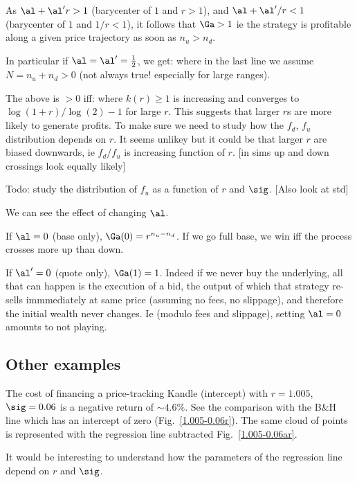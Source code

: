 \documentclass[oneside,10pt]{article}
\begin{document}
As
$\al+\al' r>1$ (barycenter of $1$ and $r>1$), and  
$\al+\al'/r<1$ (barycenter of $1$ and $1/r<1$),
it follows that $\Ga>1$ ie the strategy is profitable along a given price trajectory as soon as $n_u>n_d$.

In particular if $\al=\al'=\frac12$, we get:
where in the last line we assume $N=n_u+n_d>0$ (not always true! especially for large ranges).

The above is $>0$ iff:
where $k(r)\geq 1$ is increasing and converges to $\log(1+r)/\log(2) -1$ for large $r$.
This suggests that  larger $r$s are more likely to generate profits. To make sure we need
to study how the $f_d$, $f_u$ distribution depends on $r$. It seems unlikey but it could be that larger $r$ are biased 
downwards, ie $f_d/f_u$ is increasing function of $r$. [in sims up and down crossings 
look equally likely]

Todo: study the distribution of $f_u$ as a function of $r$ and $\sig$. [Also look at std]

We can see the effect of changing $\al$.

If $\al=0$ (base only), $\Ga(0) = r^{n_u-n_d}$. If we go full base,
we win iff the process crosses more up than down.

If $\al'=0$ (quote only), $\Ga(1) = 1$. Indeed if we never buy the underlying,
all that can happen is the execution of a bid, 
the output of which that strategy re-sells immmediately at same price (assuming no fees, no slippage),
and therefore the initial wealth never changes. Ie (modulo fees and slippage), setting $\al=0$ amounts to not playing.


\subsection{Other examples}
The cost of financing a price-tracking Kandle (intercept) with $r=1.005$, $\sig=0.06$ is a negative return of 
$\sim 4.6\%$. See the comparison with the B\&H line which has an intercept of zero (Fig.~\ref{1.005-0.06r}).
The same cloud of points is represented with the regression line subtracted Fig.~\ref{1.005-0.06ar}.

It would be interesting to understand how the parameters of the regression line depend on $r$ and $\sig$.
\end{document}

